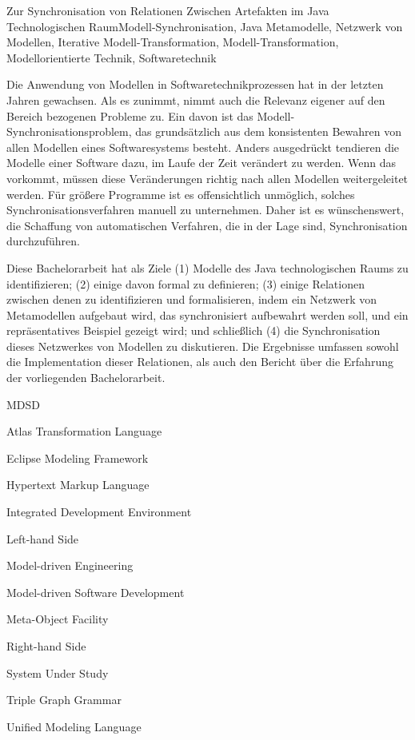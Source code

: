 \documentclass[tuberlin,cic,tc,english,noabntcite]{iiufrgs}
\begin{document}
\begin{englishabstract}{Zur Synchronisation von Relationen Zwischen Artefakten im Java Technologischen Raum}{Modell-Synchronisation, Java Metamodelle, Netzwerk von Modellen, Iterative Modell-Transformation, Modell-Transformation, Modellorientierte Technik, Softwaretechnik}

Die Anwendung von Modellen in Softwaretechnikprozessen hat in der letzten Jahren gewachsen. Als es zunimmt, nimmt auch die Relevanz eigener auf den Bereich bezogenen Probleme zu. Ein davon ist das Modell-Synchronisationsproblem, das grundsätzlich aus dem konsistenten Bewahren von allen Modellen eines Softwaresystems besteht. Anders ausgedrückt tendieren die Modelle einer Software dazu, im Laufe der Zeit verändert zu werden. Wenn das vorkommt, müssen diese Veränderungen richtig nach allen Modellen weitergeleitet werden. Für größere Programme ist es offensichtlich unmöglich, solches Synchronisationsverfahren manuell zu unternehmen. Daher ist es wünschenswert, die Schaffung von automatischen Verfahren, die in der Lage sind, Synchronisation durchzuführen.

Diese Bachelorarbeit hat als Ziele (1) Modelle des Java technologischen Raums zu identifizieren; (2) einige davon formal zu definieren; (3) einige Relationen zwischen denen zu identifizieren und formalisieren, indem ein Netzwerk von Metamodellen aufgebaut wird, das synchronisiert aufbewahrt werden soll, und ein repräsentatives Beispiel gezeigt wird; und schließlich (4) die Synchronisation dieses Netzwerkes von Modellen zu diskutieren. Die Ergebnisse umfassen sowohl die Implementation dieser Relationen, als auch den Bericht über die Erfahrung der vorliegenden Bachelorarbeit.
\end{englishabstract}

\listoffigures


\begin{listofabbrv}{MDSD}
	\item[ATL] Atlas Transformation Language
	\item[EMF] Eclipse Modeling Framework
	\item[HTML] Hypertext Markup Language
	\item[IDE] Integrated Development Environment
	\item[LHS] Left-hand Side
	\item[MDE] Model-driven Engineering
	\item[MDSD] Model-driven Software Development
	\item[MOF] Meta-Object Facility
	\item[RHS] Right-hand Side
	\item[SUS] System Under Study
    \item[TGG] Triple Graph Grammar
    \item[UML] Unified Modeling Language
\end{listofabbrv}
\end{document}
